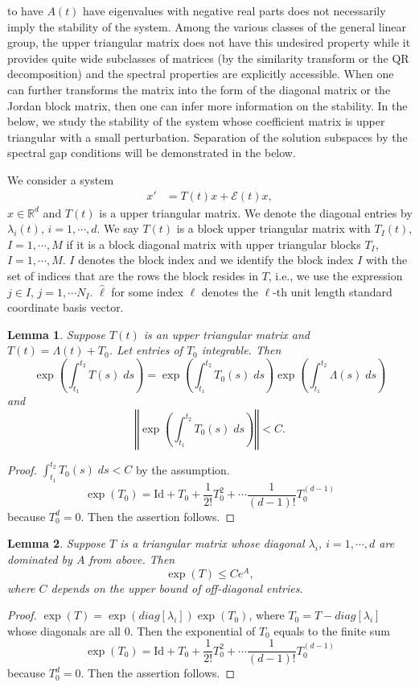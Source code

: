\documentclass[a4paper,11pt]{article}
\newtheorem{lemma}{Lemma}[section]
\theoremstyle{remark}
\begin{document}
to have $A(t)$ have eigenvalues with negative real parts does not necessarily imply the stability of the system. Among the various classes of the general linear group, the upper triangular matrix does not have this undesired property while it provides quite wide subclasses of matrices (by the similarity transform or the QR decomposition) and the spectral properties are explicitly accessible. When one can further transforms the matrix into the form of the diagonal matrix or the Jordan block matrix, then one can infer more information on the stability. In the below, we study the stability of the system whose coefficient matrix is upper triangular with a small perturbation. Separation of the solution subspaces by the spectral gap conditions will be demonstrated in the below.

We consider a system
 \begin{align} \label{eq:tri-linear}
  x' &= T(t)x + \mathcal{E}(t)x,
 \end{align}
$x\in \mathbb{R}^d$ and $T(t)$ is a upper triangular matrix. We denote the diagonal entries by $\lambda_i(t)$, $i=1,\cdots,d$. We say $T(t)$ is a block upper triangular matrix with $T_I(t)$, $I=1,\cdots,M$ if it is a block diagonal matrix with upper triangular blocks $T_I$, $I=1,\cdots,M$. $I$ denotes the block index and we identify the block index $I$ with the set of indices that are the rows the block resides in $T$, i.e., we use the expression $j\in I$, $j=1,\cdots N_I$. $\hat{\ell}$ for some index $\ell$ denotes the $\ell$-th unit length standard coordinate basis vector.





\begin{lemma} \label{lemma:expT}
 Suppose $T(t)$ is an upper triangular matrix and $T(t) = \Lambda(t) + T_0$. Let entries of $T_0$ integrable. Then
 $$ \exp\left(\int_{t_1}^{t_2}T(s)\; ds\right) = \exp\left(\int_{t_1}^{t_2}T_0(s)\; ds\right) \exp\left(\int_{t_1}^{t_2}\Lambda(s)\; ds\right)$$
 and
 $$\left\Vert\exp\left(\int_{t_1}^{t_2}T_0(s)\; ds\right)\right\Vert < C.$$
\end{lemma}
\begin{proof}
 $\int_{t_1}^{t_2}T_0(s)\; ds < C$ by the assumption.
 $$ \exp(T_0) = \textrm{Id} + T_0 + \frac{1}{2!}T_0^2 + \cdots \frac{1}{(d-1)!}T_0^{(d-1)}$$
 because $T_0^d = 0$. Then the assertion follows.
\end{proof}
\begin{lemma} \label{lemma:expT0}
 Suppose $T$ is a triangular matrix whose diagonal $\lambda_i$, $i=1,\cdots,d$ are dominated by $A$ from above. Then
 $$ \exp(T) \le C e^A,$$
 where $C$ depends on the upper bound of off-diagonal entries.
\end{lemma}
\begin{proof}
 $\exp(T) = \exp(diag[\lambda_i])\exp(T_0)$, where $T_0 = T-diag[\lambda_i]$ whose diagonals are all $0$. Then the exponential of $T_0$ equals to the finite sum
 $$ \exp(T_0) = \textrm{Id} + T_0 + \frac{1}{2!}T_0^2 + \cdots \frac{1}{(d-1)!}T_0^{(d-1)}$$
 because $T_0^d = 0$. Then the assertion follows.
\end{proof}
\end{document}
